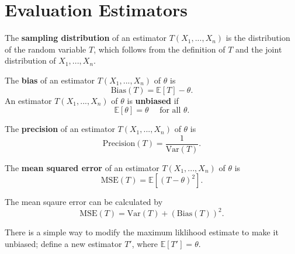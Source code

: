 \section{Evaluation Estimators}

\begin{definition}
  The {\bf sampling distribution} of an estimator $T(X_1,...,X_n)$ is the distribution of the random variable $T$, which follows from the definition of $T$ and the joint distribution of $X_1,...,X_n$.
\end{definition}

\begin{definition}
  The {\bf bias} of an estimator $T(X_1,...,X_n)$ of $\theta$ is
  \[\text{Bias}(T) = \mathbb{E}[T] - \theta.\]
An estimator $T(X_1,...,X_n)$ of $\theta$ is {\bf unbiased} if
  \[\mathbb{E}[\theta] = \theta \quad \text{ for all } \theta.\]
\end{definition}

\begin{definition}
  The {\bf precision} of an estimator $T(X_1,...,X_n)$ of $\theta$ is 
  \[\text{Precision}(T) = \frac{1}{\text{Var}(T)}.\]
\end{definition}

\begin{definition}
  The {\bf mean squared error} of an estimator $T(X_1,...,X_n)$ of $\theta$ is
  \[\text{MSE}(T) = \mathbb{E}[(T - \theta)^2].\]
\end{definition}

\begin{remark}
    The mean sqaure error can be calculated by
    \[\text{MSE}(T) = \text{Var}(T) + (\text{Bias}(T))^2.\]
\end{remark}

\noindent There is a simple way to modify the maximum liklihood estimate to make it unbiased; define a new estimator $T'$, where $\mathbb{E}[T'] = \theta$.



